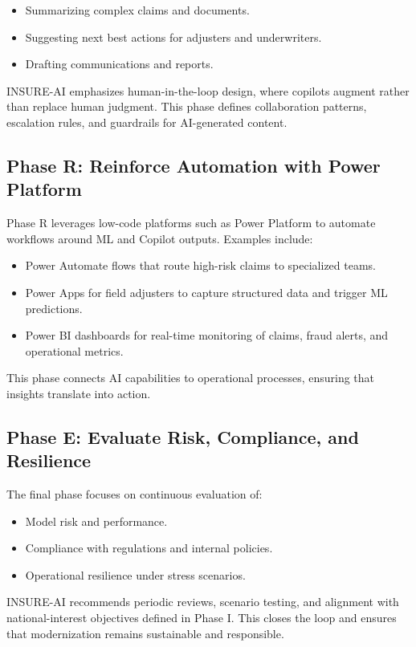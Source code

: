 \documentclass{article}
\begin{document}
\begin{itemize}
    \item Summarizing complex claims and documents.
    \item Suggesting next best actions for adjusters and underwriters.
    \item Drafting communications and reports.
\end{itemize}

INSURE-AI emphasizes human-in-the-loop design, where copilots augment rather than replace human judgment. This phase defines collaboration patterns, escalation rules, and guardrails for AI-generated content.

\subsection{Phase R: Reinforce Automation with Power Platform}
Phase R leverages low-code platforms such as Power Platform to automate workflows around ML and Copilot outputs. Examples include:

\begin{itemize}
    \item Power Automate flows that route high-risk claims to specialized teams.
    \item Power Apps for field adjusters to capture structured data and trigger ML predictions.
    \item Power BI dashboards for real-time monitoring of claims, fraud alerts, and operational metrics.
\end{itemize}

This phase connects AI capabilities to operational processes, ensuring that insights translate into action.

\subsection{Phase E: Evaluate Risk, Compliance, and Resilience}
The final phase focuses on continuous evaluation of:

\begin{itemize}
    \item Model risk and performance.
    \item Compliance with regulations and internal policies.
    \item Operational resilience under stress scenarios.
\end{itemize}

INSURE-AI recommends periodic reviews, scenario testing, and alignment with national-interest objectives defined in Phase I. This closes the loop and ensures that modernization remains sustainable and responsible.
\end{document}
